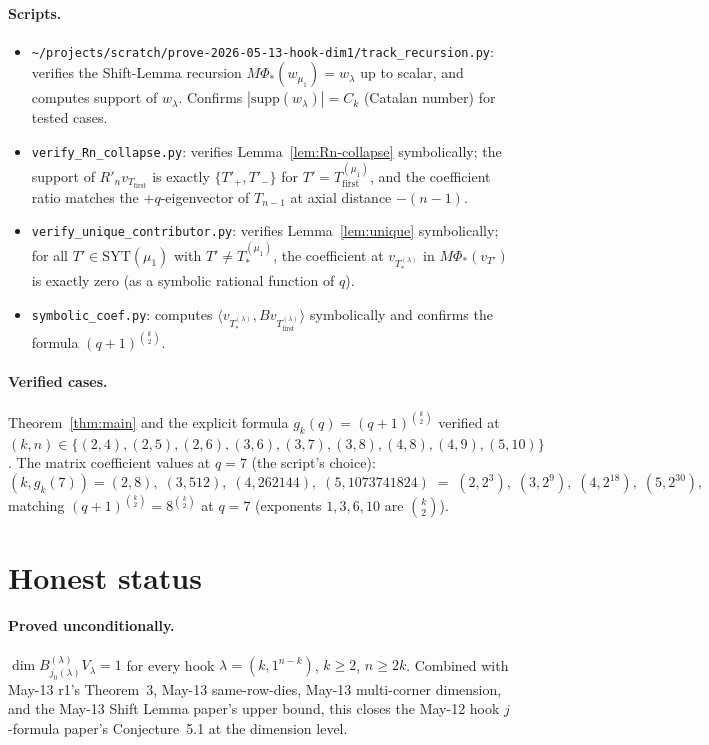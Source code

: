 \documentclass[11pt]{article}
\theoremstyle{definition}
\begin{document}
\paragraph{Scripts.}
\begin{itemize}[leftmargin=2em,topsep=0.2em,itemsep=0.1em]
\item \texttt{\textasciitilde/projects/scratch/prove-2026-05-13-hook-dim1/track\_recursion.py}:
verifies the Shift-Lemma recursion $M \Phi_*(w_{\mu_1}) = w_\lambda$
up to scalar, and computes support of $w_\lambda$.  Confirms
$|\mathrm{supp}(w_\lambda)| = C_k$ (Catalan number) for tested cases.
\item \texttt{verify\_Rn\_collapse.py}: verifies
Lemma~\ref{lem:Rn-collapse} symbolically; the support of
$R'_n v_{T_{\mathrm{first}}}$ is exactly $\{T'_+, T'_-\}$ for
$T' = T_{\mathrm{first}}^{(\mu_1)}$, and the coefficient ratio matches
the $+q$-eigenvector of $T_{n-1}$ at axial distance $-(n-1)$.
\item \texttt{verify\_unique\_contributor.py}: verifies
Lemma~\ref{lem:unique} symbolically; for all
$T' \in \mathrm{SYT}(\mu_1)$ with $T' \ne T_{*}^{(\mu_1)}$, the
coefficient at $v_{T_{*}^{(\lambda)}}$ in $M \Phi_*(v_{T'})$ is exactly
zero (as a symbolic rational function of $q$).
\item \texttt{symbolic\_coef.py}: computes
$\langle v_{T_{*}^{(\lambda)}}, B v_{T_{\mathrm{first}}^{(\lambda)}}\rangle$
symbolically and confirms the formula $(q+1)^{\binom{k}{2}}$.
\end{itemize}

\paragraph{Verified cases.}  Theorem~\ref{thm:main} and the explicit
formula $g_k(q) = (q+1)^{\binom{k}{2}}$ verified at $(k, n) \in
\{(2,4), (2,5), (2,6), (3,6), (3,7), (3,8), (4,8), (4,9), (5,10)\}$.
The matrix coefficient values at $q = 7$ (the script's choice):
\[
    (k, g_k(7)) = (2, 8),\; (3, 512),\; (4, 262144),\; (5, 1073741824)
    \;=\; (2, 2^3),\; (3, 2^9),\; (4, 2^{18}),\; (5, 2^{30}),
\]
matching $(q+1)^{\binom{k}{2}} = 8^{\binom{k}{2}}$ at $q = 7$
(exponents $1, 3, 6, 10$ are $\binom{k}{2}$).

\section{Honest status}\label{sec:status}

\paragraph{Proved unconditionally.}  $\dim B^{(\lambda)}_{j_0(\lambda)}
V_\lambda = 1$ for every hook $\lambda = (k, 1^{n-k})$, $k \ge 2$,
$n \ge 2k$.  Combined with May-13 r1's Theorem~3, May-13 same-row-dies,
May-13 multi-corner dimension, and the May-13 Shift Lemma paper's
upper bound, this closes the May-12 hook $j$-formula paper's
Conjecture~5.1 at the dimension level.
\end{document}
